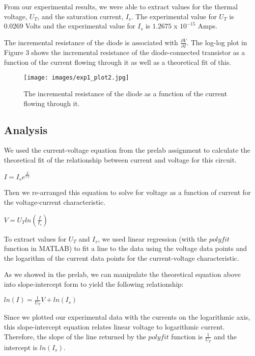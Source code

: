 \documentclass{article}
\begin{document}
From our experimental results, we were able to extract values for the thermal voltage, $U_T$, and the saturation current, $I_s$. The experimental value for $U_T$ is 0.0269 Volts and the experimental value for $I_s$ is $1.2675$ x $ 10^{-15}$ Amps. 

The incremental resistance of the diode is associated with $\frac{\partial V}{\partial I}$. The log-log plot in Figure 3 shows the incremental resistance of the diode-connected transistor as a function of the current flowing through it as well as a theoretical fit of this.

\begin{figure}[H]   
  \centering        
  \texttt{[image: images/exp1\_plot2.jpg]}
  \caption{The incremental resistance of the diode as a function of the current flowing through it.}   
  \label{fig:inres}
\end{figure}

\subsection{Analysis}
We used the current-voltage equation from the prelab assignment to calculate the theoretical fit of the relationship between current and voltage for this circuit.
\begin{center}
    $I = I_s e^{\frac{V}{U_T}}$ \\
\end{center}
 
Then we re-arranged this equation to solve for voltage as a function of current for the voltage-current characteristic. 
 \begin{center}
     $V = U_T ln(\frac{I}{I_s})$
 \end{center}
 
To extract values for $U_T$ and $I_s$, we used linear regression (with the $polyfit$ function in MATLAB) to fit a line to the data using the voltage data points and the logarithm of the current data points for the current-voltage characteristic.  

As we showed in the prelab, we can manipulate the theoretical equation above into slope-intercept form to yield the following relationship: 

\begin{center}
    $ln(I) = \frac{1}{U_T} V + ln(I_s)$
\end{center}

Since we plotted our experimental data with the currents on the logarithmic axis, this slope-intercept equation relates linear voltage to logarithmic current. Therefore, the slope of the line returned by the $polyfit$ function is $\frac{1}{U_T}$ and the intercept is $ln(I_s)$. 
\end{document}
